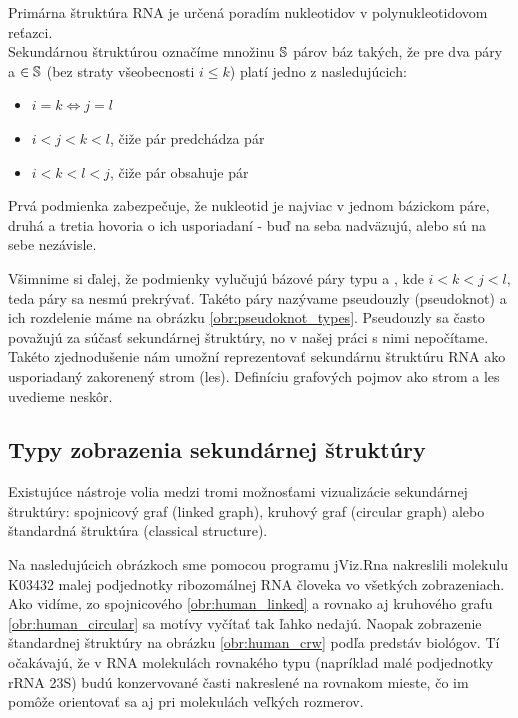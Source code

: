 \begin{definice}
  \label{def:RNA_sekundarna_struktura}
  Primárna štruktúra RNA je určená poradím nukleotidov v polynukleotidovom reťazci.
  \\
  Sekundárnou štruktúrou označíme množinu $\mathbb{S}$ párov báz  takých,
  že pre dva páry  a  $\in \mathbb{S}$ (bez straty všeobecnosti $i \leq k$)
  platí jedno z nasledujúcich:
  \begin{itemize}
    \item $i = k \iff j = l$
    \item $i < j < k < l$, čiže pár  predchádza pár 
    \item $i < k < l < j$, čiže pár  obsahuje pár 
  \end{itemize}
\end{definice}

Prvá podmienka zabezpečuje, že nukleotid je najviac v jednom bázickom páre,
druhá a tretia hovoria o ich usporiadaní - buď na seba nadväzujú, alebo
sú na sebe nezávisle.

Všimnime si ďalej, že podmienky vylučujú bázové páry typu  a ,
kde $i < k < j < l$, teda páry sa nesmú prekrývať. Takéto páry nazývame
pseudouzly (pseudoknot) a ich rozdelenie máme na obrázku \ref{obr:pseudoknot_types}.
Pseudouzly sa často považujú za súčasť sekundárnej štruktúry, no v našej práci
s nimi nepočítame. Takéto zjednodušenie nám umožní reprezentovať sekundárnu
štruktúru RNA ako usporiadaný zakorenený strom (les). Definíciu grafových
pojmov ako strom a les uvedieme neskôr.

\subsection{Typy zobrazenia sekundárnej štruktúry}

Existujúce nástroje volia medzi tromi možnosťami vizualizácie sekundárnej
štruktúry: spojnicový graf (linked graph), kruhový graf (circular graph)
alebo štandardná štruktúra (classical structure).

Na nasledujúcich obrázkoch sme pomocou programu jViz.Rna 
nakreslili molekulu K03432 malej podjednotky ribozomálnej RNA človeka
vo všetkých zobrazeniach.
Ako vidíme, zo spojnicového \ref{obr:human_linked} a rovnako aj kruhového
grafu \ref{obr:human_circular} sa motívy vyčítať tak ľahko nedajú.
Naopak zobrazenie štandardnej štruktúry na obrázku \ref{obr:human_crw}
podľa predstáv biológov.
Tí očakávajú, že v RNA molekulách rovnakého typu (napríklad malé podjednotky rRNA 23S)
budú konzervované časti nakreslené na rovnakom mieste, čo im pomôže orientovať sa
aj pri molekulách veľkých rozmerov.


